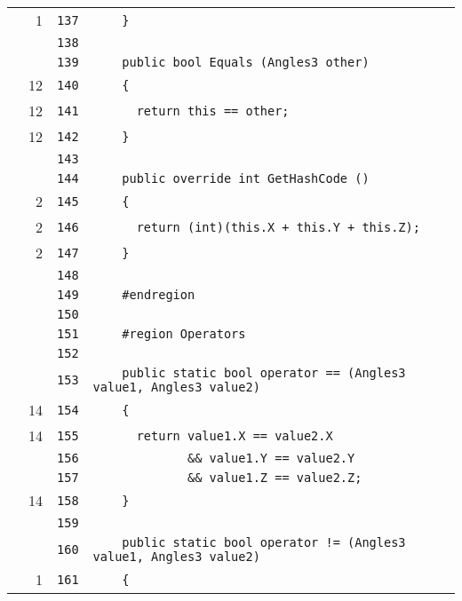 \documentclass[a4paper,10pt]{article}
\begin{document}
\begin{longtable}[l]{lrrl}
\cellcolor{green} & 1 & \verb~137~ & \verb~    }~\\
\cellcolor{gray} &  & \verb~138~ & \verb~~\\
\cellcolor{gray} &  & \verb~139~ & \verb~    public bool Equals (Angles3 other)~\\
\cellcolor{green} & 12 & \verb~140~ & \verb~    {~\\
\cellcolor{green} & 12 & \verb~141~ & \verb~      return this == other;~\\
\cellcolor{green} & 12 & \verb~142~ & \verb~    }~\\
\cellcolor{gray} &  & \verb~143~ & \verb~~\\
\cellcolor{gray} &  & \verb~144~ & \verb~    public override int GetHashCode ()~\\
\cellcolor{green} & 2 & \verb~145~ & \verb~    {~\\
\cellcolor{green} & 2 & \verb~146~ & \verb~      return (int)(this.X + this.Y + this.Z);~\\
\cellcolor{green} & 2 & \verb~147~ & \verb~    }~\\
\cellcolor{gray} &  & \verb~148~ & \verb~~\\
\cellcolor{gray} &  & \verb~149~ & \verb~    #endregion~\\
\cellcolor{gray} &  & \verb~150~ & \verb~~\\
\cellcolor{gray} &  & \verb~151~ & \verb~    #region Operators~\\
\cellcolor{gray} &  & \verb~152~ & \verb~~\\
\cellcolor{gray} &  & \verb~153~ & \verb~    public static bool operator == (Angles3 value1, Angles3 value2)~\\
\cellcolor{green} & 14 & \verb~154~ & \verb~    {~\\
\cellcolor{green} & 14 & \verb~155~ & \verb~      return value1.X == value2.X~\\
\cellcolor{gray} &  & \verb~156~ & \verb~             && value1.Y == value2.Y~\\
\cellcolor{gray} &  & \verb~157~ & \verb~             && value1.Z == value2.Z;~\\
\cellcolor{green} & 14 & \verb~158~ & \verb~    }~\\
\cellcolor{gray} &  & \verb~159~ & \verb~~\\
\cellcolor{gray} &  & \verb~160~ & \verb~    public static bool operator != (Angles3 value1, Angles3 value2)~\\
\cellcolor{green} & 1 & \verb~161~ & \verb~    {~\\

\end{longtable}
\end{document}
